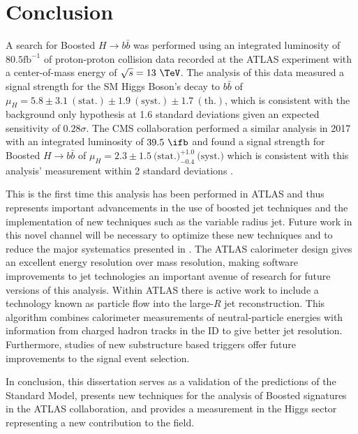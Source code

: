\chapter{Conclusion} \label{chap:conclusion}

A search for Boosted $H \rightarrow b\bar{b}$ was performed using an integrated
luminosity of $80.5 \text{fb}^{-1}$ of proton-proton collision data recorded at
the ATLAS experiment with a center-of-mass energy of $\sqrt{s} = 13~\TeV$. The
analysis of this data measured a signal strength for the SM Higgs Boson's decay
to $b\bar{b}$ of $\mu_{H} = 5.8 \pm 3.1~\mathrm{(stat.)} \pm
1.9~\mathrm{(syst.)} \pm 1.7~\mathrm{(th.)}$, which is consistent with the
background only hypothesis at 1.6 standard deviations given an expected
sensitivity of $0.28\sigma$.  The CMS collaboration performed a similar
analysis in 2017 with an integrated luminosity of $39.5~\ifb$ and found a
signal strength for Boosted $H \rightarrow b\bar{b}$ of $\mu_{H} = 2.3 \pm
1.5~\text{(stat.)}_{-0.4}^{+1.0}~\text{(syst.)}$ which is consistent with this
analysis' measurement within 2 standard deviations \cite{Sirunyan:2017dgc}.

This is the first time this analysis has been performed in ATLAS and thus
represents important advancements in the use of boosted jet techniques and the
implementation of new techniques such as the variable radius jet.  Future work
in this novel channel will be necessary to optimize these new techniques and to
reduce the major systematics presented in .  The ATLAS
calorimeter design gives an excellent energy resolution over mass resolution,
making software improvements to jet technologies an important avenue of
research for future versions of this analysis. Within ATLAS there is active
work to include a technology known as particle flow into the large-$R$ jet
reconstruction. This algorithm combines calorimeter measurements of
neutral-particle energies with information from charged hadron tracks in the ID
to give better jet resolution.  Furthermore, studies of new substructure based
triggers offer future improvements to the signal event selection.

In conclusion, this dissertation serves as a validation of the predictions of
the Standard Model, presents new techniques for the analysis of Boosted
signatures in the ATLAS collaboration, and provides a measurement in the
Higgs sector representing a new contribution to the field.
